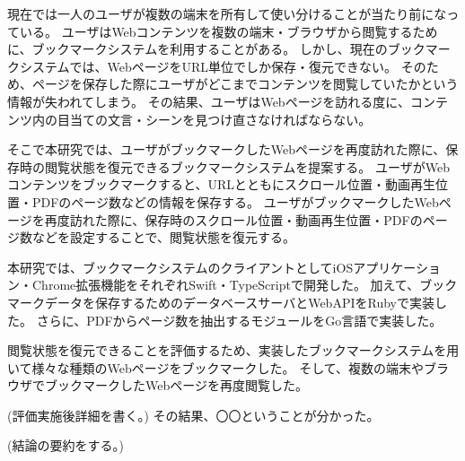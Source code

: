\begin{jabstract}

  現在では一人のユーザが複数の端末を所有して使い分けることが当たり前になっている。
  ユーザはWebコンテンツを複数の端末・ブラウザから閲覧するために、ブックマークシステムを利用することがある。
  しかし、現在のブックマークシステムでは、WebページをURL単位でしか保存・復元できない。
  そのため、ページを保存した際にユーザがどこまでコンテンツを閲覧していたかという情報が失われてしまう。
  その結果、ユーザはWebページを訪れる度に、コンテンツ内の目当ての文言・シーンを見つけ直さなければならない。  

  そこで本研究では、ユーザがブックマークしたWebページを再度訪れた際に、保存時の閲覧状態を復元できるブックマークシステムを提案する。
  ユーザがWebコンテンツをブックマークすると、URLとともにスクロール位置・動画再生位置・PDFのページ数などの情報を保存する。
  ユーザがブックマークしたWebページを再度訪れた際に、保存時のスクロール位置・動画再生位置・PDFのページ数などを設定することで、閲覧状態を復元する。

  本研究では、ブックマークシステムのクライアントとしてiOSアプリケーション・Chrome拡張機能をそれぞれSwift・TypeScriptで開発した。
  加えて、ブックマークデータを保存するためのデータベースサーバとWebAPIをRubyで実装した。
  さらに、PDFからページ数を抽出するモジュールをGo言語で実装した。

  閲覧状態を復元できることを評価するため、実装したブックマークシステムを用いて様々な種類のWebページをブックマークした。
  そして、複数の端末やブラウザでブックマークしたWebページを再度閲覧した。

  (評価実施後詳細を書く。)
  その結果、〇〇ということが分かった。

  (結論の要約をする。)

\end{jabstract}
